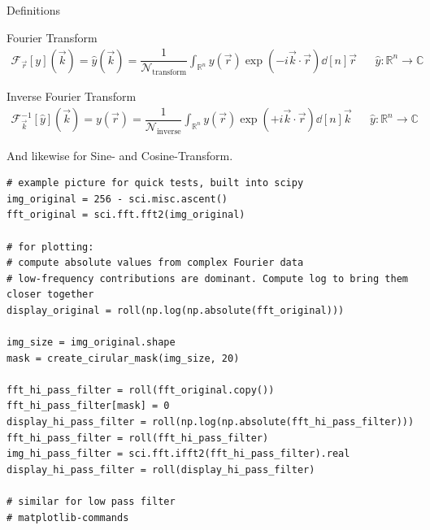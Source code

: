 \begin{frame}{Definitions}
%
\begin{defbox}
\small
Fourier Transform
\begin{align*}
	\mathcal{F}_{\vec{r}}[y](\vec{k})
=
	\hat{y}(\vec{k})
=
	\dfrac{1}{\mathcal{N}_{\text{transform}}}	
	\int_{\mathbb{R}^n}
		y(\vec{r}) \exp(-i\vec{k} \cdot \vec{r}) \dd[n]{\vec{r}}
&&
	\hat{y}: \mathbb{R}^{n} \to \mathbb{C}
\end{align*}


Inverse Fourier Transform
\begin{align*}
	\mathcal{F}_{\vec{k}}^{-1}[\hat{y}](\vec{k})
=
	y(\vec{r})
=
	\dfrac{1}{\mathcal{N}_{\text{inverse}}}	
	\int_{\mathbb{R}^n}
		y(\vec{r}) \exp(+i\vec{k} \cdot \vec{r}) \dd[n]{\vec{k}}
&&
	\hat{y}: \mathbb{R}^{n} \to \mathbb{C}
\end{align*}

And likewise for Sine- and Cosine-Transform.
\end{defbox}
%
\end{frame}


\begin{frame}[fragile]
%
\begin{codebox}
\begin{verbatim}
# example picture for quick tests, built into scipy
img_original = 256 - sci.misc.ascent()
fft_original = sci.fft.fft2(img_original)

# for plotting:
# compute absolute values from complex Fourier data
# low-frequency contributions are dominant. Compute log to bring them closer together
display_original = roll(np.log(np.absolute(fft_original)))

img_size = img_original.shape
mask = create_cirular_mask(img_size, 20)
    
fft_hi_pass_filter = roll(fft_original.copy())
fft_hi_pass_filter[mask] = 0
display_hi_pass_filter = roll(np.log(np.absolute(fft_hi_pass_filter)))
fft_hi_pass_filter = roll(fft_hi_pass_filter)
img_hi_pass_filter = sci.fft.ifft2(fft_hi_pass_filter).real
display_hi_pass_filter = roll(display_hi_pass_filter)

# similar for low pass filter
# matplotlib-commands
\end{verbatim}
\end{codebox}
%
\end{frame}

